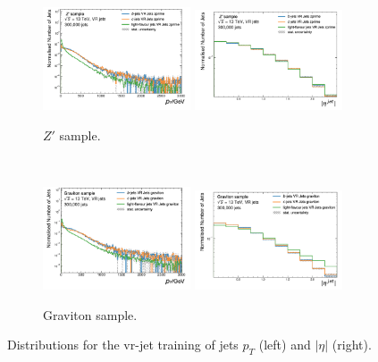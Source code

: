 \begin{figure}[h!]
\begin{subfigure}[b]{0.98\textwidth}
      \label{apfig:vrjetdistt}
  \end{subfigure}\\
  \begin{subfigure}[b]{0.98\textwidth}
      \centering
      \includegraphics[width=0.48\textwidth]{Images/FTAG/VRDips/JetDist/zppt.png}
      \includegraphics[width=0.48\textwidth]{Images/FTAG/VRDips/JetDist/zpeta.png}
      \caption{$Z'$ sample.} 
      \label{apfig:vrjetdiszp}
  \end{subfigure}\\
  \begin{subfigure}[b]{0.98\textwidth}
      \centering
      \includegraphics[width=0.48\textwidth]{Images/FTAG/VRDips/JetDist/grpt.png}
      \includegraphics[width=0.48\textwidth]{Images/FTAG/VRDips/JetDist/greta.png}
      \caption{Graviton sample.} 
      \label{apfig:vrjetdisgr}
  \end{subfigure}
  \caption{Distributions for the \gls{vr}-jet training of jets $p_T$ (left) and $|\eta|$ (right).}
  \label{apfig:vrjetdist}
\end{figure} 

